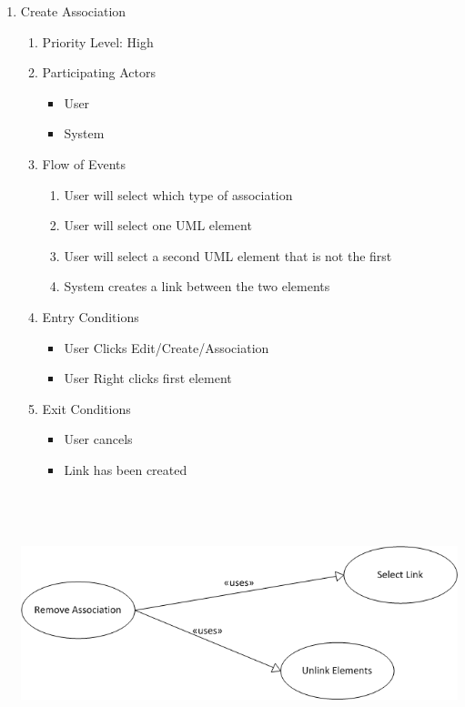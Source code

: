 \documentclass[a4paper, 12pt]{article}
\begin{document}
\begin{enumerate}
\item Create Association
  \begin {enumerate}
  \item Priority Level: High
  \item Participating Actors
    \begin {itemize}
    \item User
    \item System
    \end {itemize}
  \item Flow of Events
    \begin {enumerate}
    \item User will select which type of association
    \item User will select one UML element
    \item User will select a second UML element that is not the first
    \item System creates a link between the two elements
    \end {enumerate}
  \item Entry Conditions
    \begin {itemize}
    \item User Clicks Edit/Create/Association
    \item User Right clicks first element
    \end {itemize}
  \item Exit Conditions
    \begin {itemize}
    \item User cancels
    \item Link has been created
    \end {itemize}
  \end {enumerate}

  \begin {center}
    \includegraphics[width=5in, height=3in] {img/RemoveAssociation.png}
  \end {center}


\end{enumerate}
\end{document}
